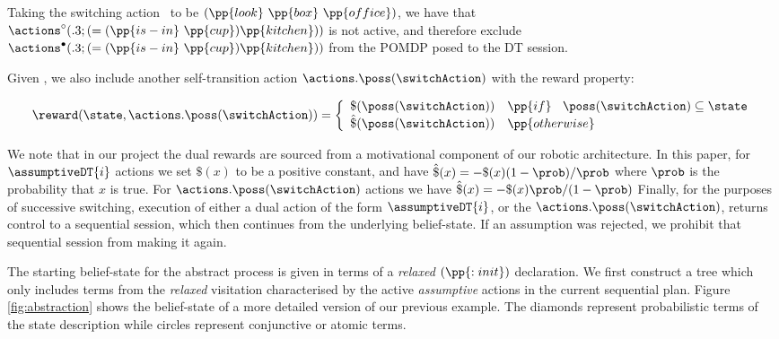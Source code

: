\noindent Taking the switching action \switchAction\ to be
$(\pp{look}~\pp{box}~\pp{office})$, we have that
$\actions^{\circ}(.3;(=(\pp{is-in}~\pp{cup})\pp{kitchen}))$ is not
active, and therefore exclude
$\actions^{\bullet}(.3;(=(\pp{is-in}~\pp{cup})\pp{kitchen}))$ from the
POMDP posed to the DT session. 

Given \switchAction, we also include another self-transition action
$\actions.\poss(\switchAction)$ with the reward property:

\[
\reward(\state, \actions.\poss(\switchAction)) = \bigg\{ \begin{array}{ll}
\$(\poss(\switchAction)) & \pp{if}~\;\; \poss(\switchAction) \subseteq \state \\
\hat\$(\poss(\switchAction)) & \pp{otherwise} \\
\end{array}
\]


\noindent We note that in our project the dual rewards are sourced
from a motivational component of our robotic architecture. In this
paper, for $\assumptiveDT{i}$ actions we set $\$(x)$ to be a positive
constant, and have $\hat\$(x)= - \$(x)(1 - \prob) / \prob$ where
$\prob$ is the probability that $x$ is true. For
$\actions.\poss(\switchAction)$ actions we have $\hat\$(x)= -
\$(x)\prob/(1-\prob)$
Finally, for the purposes of successive switching, execution of either a dual
action of the form $\assumptiveDT{i}$, or the
$\actions.\poss(\switchAction)$, returns control to a sequential
session, which then continues from the underlying belief-state. If an
assumption was rejected, we prohibit that sequential session from
making it again.


The starting belief-state for the abstract process is given in terms
of a {\em relaxed} $(\pp{:init})$ declaration. We first construct a
tree which only includes terms from the {\em relaxed} visitation
characterised by the active {\em assumptive} actions in the current
sequential plan. Figure \ref{fig:abstraction} shows the belief-state
of a more detailed version of our previous example. The diamonds
represent probabilistic terms of the state description while circles
represent conjunctive or atomic terms. 

